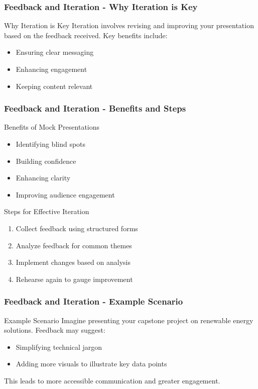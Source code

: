 \documentclass{beamer}
\begin{document}
\begin{frame}[fragile]
    \frametitle{Feedback and Iteration - Why Iteration is Key}
    \begin{block}{Why Iteration is Key}
        Iteration involves revising and improving your presentation based on the feedback received. Key benefits include:
        \begin{itemize}
            \item Ensuring clear messaging
            \item Enhancing engagement
            \item Keeping content relevant
        \end{itemize}
    \end{block}
\end{frame}

\begin{frame}[fragile]
    \frametitle{Feedback and Iteration - Benefits and Steps}
    \begin{block}{Benefits of Mock Presentations}
        \begin{itemize}
            \item Identifying blind spots
            \item Building confidence
            \item Enhancing clarity
            \item Improving audience engagement
        \end{itemize}
    \end{block}
    
    \begin{block}{Steps for Effective Iteration}
        \begin{enumerate}
            \item Collect feedback using structured forms
            \item Analyze feedback for common themes
            \item Implement changes based on analysis
            \item Rehearse again to gauge improvement
        \end{enumerate}
    \end{block}
\end{frame}

\begin{frame}[fragile]
    \frametitle{Feedback and Iteration - Example Scenario}
    \begin{block}{Example Scenario}
        Imagine presenting your capstone project on renewable energy solutions. Feedback may suggest:
        \begin{itemize}
            \item Simplifying technical jargon
            \item Adding more visuals to illustrate key data points
        \end{itemize}
        This leads to more accessible communication and greater engagement.
    \end{block}
\end{frame}
\end{document}
